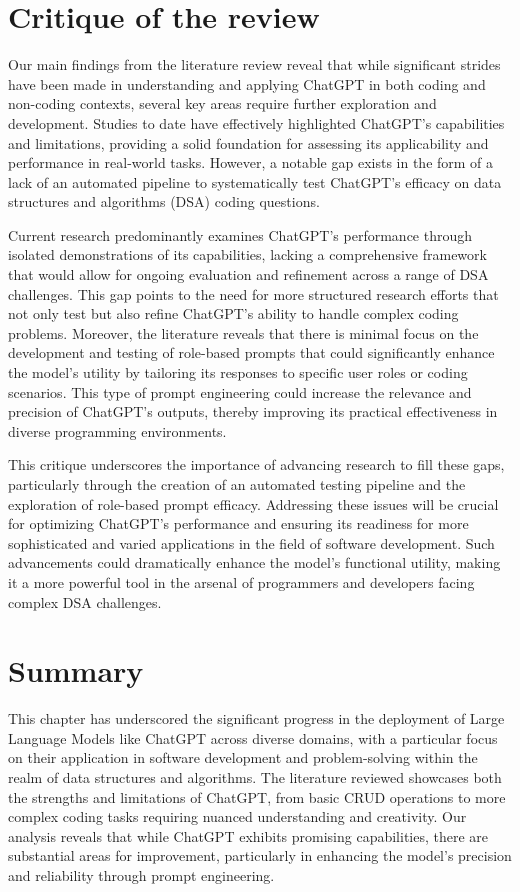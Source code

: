 \section{Critique of the review} %
Our main findings from the literature review reveal that while significant strides have been made in understanding and applying ChatGPT in both coding and non-coding contexts, several key areas require further exploration and development. Studies to date have effectively highlighted ChatGPT's capabilities and limitations, providing a solid foundation for assessing its applicability and performance in real-world tasks. However, a notable gap exists in the form of a lack of an automated pipeline to systematically test ChatGPT’s efficacy on data structures and algorithms (DSA) coding questions.

Current research predominantly examines ChatGPT's performance through isolated demonstrations of its capabilities, lacking a comprehensive framework that would allow for ongoing evaluation and refinement across a range of DSA challenges. This gap points to the need for more structured research efforts that not only test but also refine ChatGPT’s ability to handle complex coding problems. Moreover, the literature reveals that there is minimal focus on the development and testing of role-based prompts that could significantly enhance the model’s utility by tailoring its responses to specific user roles or coding scenarios. This type of prompt engineering could increase the relevance and precision of ChatGPT’s outputs, thereby improving its practical effectiveness in diverse programming environments.

This critique underscores the importance of advancing research to fill these gaps, particularly through the creation of an automated testing pipeline and the exploration of role-based prompt efficacy. Addressing these issues will be crucial for optimizing ChatGPT’s performance and ensuring its readiness for more sophisticated and varied applications in the field of software development. Such advancements could dramatically enhance the model's functional utility, making it a more powerful tool in the arsenal of programmers and developers facing complex DSA challenges. ~\\

\section{Summary} 
This chapter has underscored the significant progress in the deployment of Large Language Models like ChatGPT across diverse domains, with a particular focus on their application in software development and problem-solving within the realm of data structures and algorithms. The literature reviewed showcases both the strengths and limitations of ChatGPT, from basic CRUD operations to more complex coding tasks requiring nuanced understanding and creativity. Our analysis reveals that while ChatGPT exhibits promising capabilities, there are substantial areas for improvement, particularly in enhancing the model's precision and reliability through prompt engineering.

